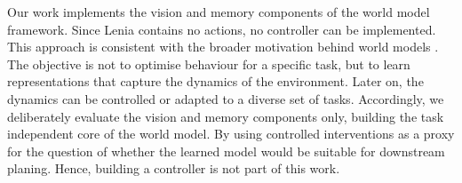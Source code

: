 Our work implements the vision and memory components of the world model framework.
Since Lenia contains no actions, no controller can be implemented.
This approach is consistent with the broader motivation behind world models \parencite{maes2026leworldmodelstableendtoendjointembedding}.
The objective is not to optimise behaviour for a specific task, but to learn representations that capture the dynamics of the environment.
Later on, the dynamics can be controlled or adapted to a diverse set of tasks.
Accordingly, we deliberately evaluate the vision and memory components only, building the task independent core of the world model.
By using controlled interventions as a proxy for the question of whether the learned model would be suitable for downstream planing.
Hence, building a controller is not part of this work.



